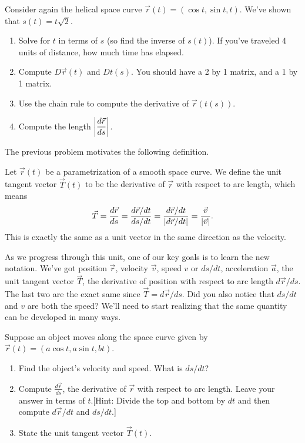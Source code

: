 \begin{problem}
Consider again the helical space curve $\vec r(t)=(\cos t, \sin t, t)$.  We've shown that $s(t) = t\sqrt{2}$. 
\begin{enumerate}
 \item Solve for $t$ in terms of $s$ (so find the inverse of $s(t)$). If you've traveled 4 units of distance, how much time has elapsed.   
 \item Compute $D\vec r(t)$ and $Dt(s)$.  You should have a 2 by 1 matrix, and a 1 by 1 matrix. 
 \item Use the chain rule to compute the derivative of $\vec r(t(s))$.
 \item Compute the length $\left|\displaystyle\frac{d\vec r}{ds}\right|$.
\end{enumerate}
\end{problem}

The previous problem motivates the following definition.

\begin{definition}\label{def unit tangent vector}
 Let $\vec r(t)$ be a parametrization of a smooth space curve. We define the unit tangent vector $\vec T(t)$ to be the derivative of $\vec r$ with respect to arc length, which means
$$\vec T = \displaystyle\frac{d\vec r}{ds}=\displaystyle\frac{d\vec r/dt}{ds/dt} = \frac{d\vec r/dt}{|d \vec r/dt|} = \frac{\vec v}{|\vec v|}.$$
This is exactly the same as a unit vector in the same direction as the velocity.
\end{definition}

As we progress through this unit, one of our key goals is to learn the new notation.  We've got position $\vec r$,  velocity $\vec v$, speed $v$ or $ds/dt$, acceleration $\vec a$, the unit tangent vector $\vec T$, the derivative of position with respect to arc length $d\vec r/ds$.  The last two are the exact same since $\vec T = d\vec r/ds$. Did you also notice that $ds/dt$ and $v$ are both the speed?  We'll need to start realizing that the same quantity can be developed in many ways. 

\begin{problem}
%
 Suppose an object moves along the space curve given by  $\vec r(t)=(a\cos t,a\sin t,b t)$. 
\begin{enumerate}
 \item Find the object's velocity and speed. What is $ds/dt$?
 \item Compute $\frac{d\vec r}{ds}$, the derivative of $\vec r$ with respect to arc length. Leave your answer in terms of $t$.[Hint: Divide the top and bottom by $dt$ and then compute $d\vec r/dt$ and $ds/dt$.]  
 \item State the unit tangent vector $\vec T(t)$.
\end{enumerate}
\end{problem}

